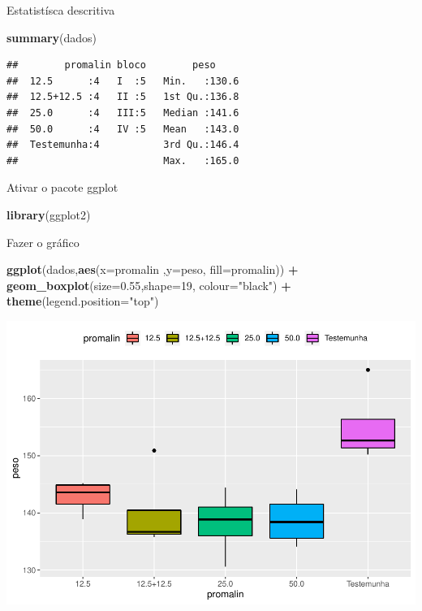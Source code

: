 \documentclass[]{book}
\newenvironment{Shaded}{\begin{snugshade}}{\end{snugshade}}
\newcommand{\DataTypeTok}[1]{\textcolor[rgb]{0.13,0.29,0.53}{#1}}
\newcommand{\DecValTok}[1]{\textcolor[rgb]{0.00,0.00,0.81}{#1}}
\newcommand{\FloatTok}[1]{\textcolor[rgb]{0.00,0.00,0.81}{#1}}
\newcommand{\KeywordTok}[1]{\textcolor[rgb]{0.13,0.29,0.53}{\textbf{#1}}}
\newcommand{\NormalTok}[1]{#1}
\newcommand{\OperatorTok}[1]{\textcolor[rgb]{0.81,0.36,0.00}{\textbf{#1}}}
\newcommand{\StringTok}[1]{\textcolor[rgb]{0.31,0.60,0.02}{#1}}
\begin{document}
Estatistísca descritiva

\begin{Shaded}
\begin{Highlighting}[]
\KeywordTok{summary}\NormalTok{(dados)}
\end{Highlighting}
\end{Shaded}

\begin{verbatim}
##        promalin bloco        peso      
##  12.5      :4   I  :5   Min.   :130.6  
##  12.5+12.5 :4   II :5   1st Qu.:136.8  
##  25.0      :4   III:5   Median :141.6  
##  50.0      :4   IV :5   Mean   :143.0  
##  Testemunha:4           3rd Qu.:146.4  
##                         Max.   :165.0
\end{verbatim}

Ativar o pacote ggplot

\begin{Shaded}
\begin{Highlighting}[]
\KeywordTok{library}\NormalTok{(ggplot2)}
\end{Highlighting}
\end{Shaded}

Fazer o gráfico

\begin{Shaded}
\begin{Highlighting}[]
\KeywordTok{ggplot}\NormalTok{(dados,}\KeywordTok{aes}\NormalTok{(}\DataTypeTok{x=}\NormalTok{promalin ,}\DataTypeTok{y=}\NormalTok{peso, }\DataTypeTok{fill=}\NormalTok{promalin)) }\OperatorTok{+}\StringTok{ }
\StringTok{      }\KeywordTok{geom_boxplot}\NormalTok{(}\DataTypeTok{size=}\FloatTok{0.55}\NormalTok{,}\DataTypeTok{shape=}\DecValTok{19}\NormalTok{, }\DataTypeTok{colour=}\StringTok{"black"}\NormalTok{) }\OperatorTok{+}\StringTok{ }
\StringTok{      }\KeywordTok{theme}\NormalTok{(}\DataTypeTok{legend.position=}\StringTok{"top"}\NormalTok{) }
\end{Highlighting}
\end{Shaded}

\includegraphics{TudodoR_files/figure-latex/unnamed-chunk-232-1.pdf}
\end{document}
